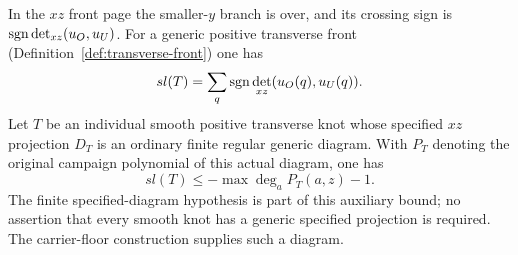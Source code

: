 \begin{theorem}
\label{fd:contact}
In the $xz$ front page the smaller-$y$ branch is over, and its crossing
sign is $\operatorname{sgn}\det_{xz}(u_O,u_U)$. For a generic positive transverse front
(Definition~\ref{def:transverse-front}) one has
\begin{equation}\label{fd:front-writhe}
 sl(T)=\sum_q\operatorname{sgn}\det_{xz}(u_O(q),u_U(q)).
\end{equation}
Let $T$ be an individual smooth positive transverse knot whose specified
$xz$ projection $D_T$ is an ordinary finite regular generic diagram.
With $P_T$ denoting the original campaign polynomial of this actual
diagram, one has
\begin{equation}\label{fd:representative-bound}
 sl(T)\leq-\max\deg_a P_T(a,z)-1.
\end{equation}
The finite specified-diagram hypothesis is part of this auxiliary bound;
no assertion that every smooth knot has a generic specified projection
is required. The carrier-floor construction supplies such a diagram.
\end{theorem}
